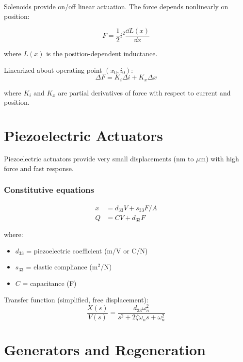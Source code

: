 Solenoids provide on/off linear actuation. The force depends nonlinearly on position:

\begin{equation}
F = \frac{1}{2}i^2\frac{\dd L(x)}{\dd x}
\end{equation}

where $L(x)$ is the position-dependent inductance.

Linearized about operating point $(x_0, i_0)$:
\begin{equation}
\Delta F = K_i \Delta i + K_x \Delta x
\end{equation}

where $K_i$ and $K_x$ are partial derivatives of force with respect to current and position.

\section{Piezoelectric Actuators}
\label{sec:piezo}

Piezoelectric actuators provide very small displacements (nm to $\mu$m) with high force and fast response.

\subsubsection{Constitutive equations}
\begin{align}
x &= d_{33} V + s_{33} F/A \\
Q &= C V + d_{33} F
\end{align}

where:
\begin{itemize}
    \item $d_{33}$ = piezoelectric coefficient (m/V or C/N)
    \item $s_{33}$ = elastic compliance (m$^2$/N)
    \item $C$ = capacitance (F)
\end{itemize}

Transfer function (simplified, free displacement):
\begin{equation}
\frac{X(s)}{V(s)} = \frac{d_{33}\omega_n^2}{s^2 + 2\zeta\omega_n s + \omega_n^2}
\end{equation}

\section{Generators and Regeneration}
\label{sec:generators}

